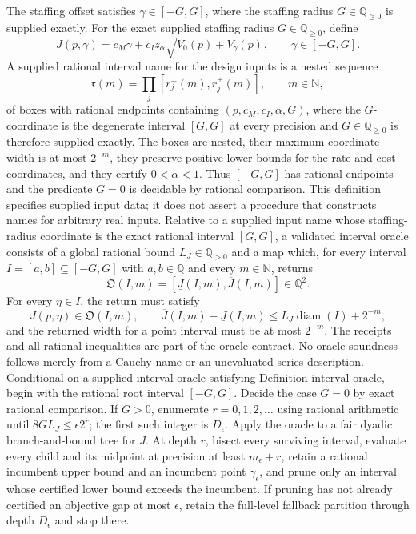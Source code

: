 The staffing offset satisfies \(\gamma\in[-G,G]\), where the staffing radius \(G\in\mathbb Q_{\geq 0}\) is supplied exactly.
For the exact supplied staffing radius \(G\in\mathbb Q_{\geq0}\), define
\[
 J(p,\gamma)=c_M\gamma+c_Iz_\alpha\sqrt{V_0(p)+V_\gamma(p)},
 \qquad \gamma\in[-G,G].
\]
A supplied rational interval name for the design inputs is a nested sequence
\[
 \mathfrak r(m)=\prod_j[r_j^-(m),r_j^+(m)],\qquad m\in\mathbb N,
\]
of boxes with rational endpoints containing \((p,c_M,c_I,\alpha,G)\), where the \(G\)-coordinate is the degenerate interval \([G,G]\) at every precision and \(G\in\mathbb Q_{\geq0}\) is therefore supplied exactly.  The boxes are nested, their maximum coordinate width is at most \(2^{-m}\), they preserve positive lower bounds for the rate and cost coordinates, and they certify \(0<\alpha<1\).  Thus \([-G,G]\) has rational endpoints and the predicate \(G=0\) is decidable by rational comparison.  This definition specifies supplied input data; it does not assert a procedure that constructs names for arbitrary real inputs.
Relative to a supplied input name whose staffing-radius coordinate is the exact rational interval \([G,G]\), a validated interval oracle consists of a global rational bound \(L_J\in\mathbb Q_{>0}\) and a map which, for every interval \(I=[a,b]\subseteq[-G,G]\) with \(a,b\in\mathbb Q\) and every \(m\in\mathbb N\), returns
\[
 \mathfrak O(I,m)=[\underline J(I,m),\overline J(I,m)]\in\mathbb Q^2.
\]
For every \(\eta\in I\), the return must satisfy
\[
 J(p,\eta)\in\mathfrak O(I,m),
 \qquad
 \overline J(I,m)-\underline J(I,m)
 \leq L_J\operatorname{diam}(I)+2^{-m},
\]
and the returned width for a point interval must be at most \(2^{-m}\).  The receipts and all rational inequalities are part of the oracle contract.  No oracle soundness follows merely from a Cauchy name or an unevaluated series description.
Conditional on a supplied interval oracle satisfying Definition \(\mathrm{interval\mbox{-}oracle}\), begin with the rational root interval \([-G,G]\).  Decide the case \(G=0\) by exact rational comparison.  If \(G>0\), enumerate \(r=0,1,2,\ldots\) using rational arithmetic until \(8GL_J\leq\epsilon2^r\); the first such integer is \(D_\epsilon\).  Apply the oracle to a fair dyadic branch-and-bound tree for \(J\).  At depth \(r\), bisect every surviving interval, evaluate every child and its midpoint at precision at least \(m_\epsilon+r\), retain a rational incumbent upper bound and an incumbent point \(\gamma_\epsilon\), and prune only an interval whose certified lower bound exceeds the incumbent.  If pruning has not already certified an objective gap at most \(\epsilon\), retain the full-level fallback partition through depth \(D_\epsilon\) and stop there.
